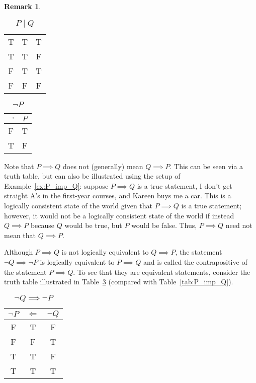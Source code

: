 \documentclass{article}
\theoremstyle{definition}
\newtheorem{remark}{Remark}
\begin{document}
\begin{itemize}
\begin{remark}
\begin{table}[ht]
\begin{tabular}{c c c}
             T & \color{blue}T & T \\
             T & \color{blue}T & F \\
             F & \color{blue}T & T \\
             F & \color{blue}F & F \\
        \end{tabular}
        \caption{$P\mid Q$}
        \label{tab:P_or_Q}
    \end{table}
    \begin{table}[ht]
        \centering
        \begin{tabular}{c c}
             \color{blue}$\neg$ & $P$ \\\hline
             \color{blue}F & T  \\
             \color{blue}T & F  \\
        \end{tabular}
        \caption{$\neg P$}
        \label{tab:not_P}
    \end{table}
    \end{remark}
\end{itemize}

Note that $P \implies Q$ does not (generally) mean $Q \implies P$. This can be seen via a truth table, but can also be illustrated using the setup of Example~\ref{ex:P_imp_Q}: suppose $P\implies Q$ is a true statement, I don't get straight A's in the first-year courses, and Kareen buys me a car. This is a logically consistent state of the world given that $P\implies Q$ is a true statement; however, it would not be a logically consistent state of the world if instead $Q\implies P$ because $Q$ would be true, but $P$ would be false. Thus, $P\implies Q$ need not mean that $Q \implies P$. 

Although $P\implies Q$ is not logically equivalent to $Q \implies P$, the statement $\neg Q \implies \neg P$ is logically equivalent to $P \implies Q$ and is called the contrapositive of the statement $P\implies Q$. To see that they are equivalent statements, consider the truth table illustrated in Table~\ref{tab:contrapositive} (compared with Table~\ref{tab:P_imp_Q}).
\begin{table}[ht]
        \centering
        \begin{tabular}{c c c}
             $\neg P$ & \color{blue}$\Longleftarrow$\color{black} & $\neg Q$\\\hline
             F & \color{blue}T & F \\
             F & \color{blue}F & T \\
             T & \color{blue}T & F \\
             T & \color{blue}T & T \\
        \end{tabular}
        \caption{$\neg Q \implies \neg P$}
        \label{tab:contrapositive}
    \end{table}
\end{document}

